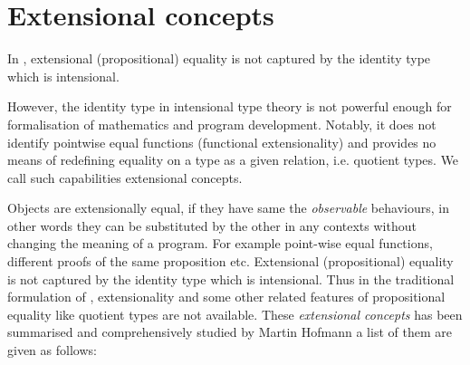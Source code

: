 


\section{Extensional concepts}
\label{extensionality}



In \itt, extensional (propositional) equality is not captured by the identity type which is intensional.

However, the identity type in intensional type theory is not powerful enough for formalisation of mathematics and program development. Notably, it does not identify pointwise equal functions (functional extensionality) and provides no means of redefining equality on a type as a given relation, i.e. quotient types. We call such capabilities extensional concepts.



Objects are extensionally equal, if they have same the \emph{observable} behaviours, in other words they  can be substituted by the other in any contexts without changing the meaning of a program. For example point-wise equal functions, different proofs of the same proposition etc. Extensional (propositional) equality is not captured by the identity type which is intensional.
Thus in the traditional formulation of \itt, extensionality and some other related features of propositional equality like quotient types are not available. These \emph{extensional concepts} has been summarised and comprehensively studied by Martin Hofmann \cite{hof:phd} a list of them are given as follows:


